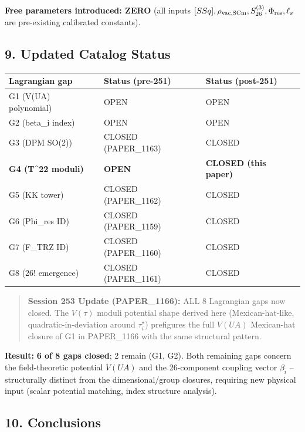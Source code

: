 \documentclass[
]{article}
\newcounter{none} %
\begin{document}
\textbf{Free parameters introduced: ZERO} (all inputs
\([SSq], \rho_{\rm vac,SCm},
S_{26}^{(3)}, \Phi_{\rm res}, \ell_s\) are pre-existing calibrated
constants).

\subsection{9. Updated Catalog Status}\label{updated-catalog-status}

{\def\LTcaptype{none} %
\begin{longtable}[]{@{}lll@{}}
\toprule\noalign{}
Lagrangian gap & Status (pre-251) & Status (post-251) \\
\midrule\noalign{}
\endhead
\bottomrule\noalign{}
\endlastfoot
G1 (V(UA) polynomial) & OPEN & OPEN \\
G2 (beta\_i index) & OPEN & OPEN \\
G3 (DPM SO(2)) & CLOSED (PAPER\_1163) & CLOSED \\
\textbf{G4 (T\^{}22 moduli)} & \textbf{OPEN} & \textbf{CLOSED (this
paper)} \\
G5 (KK tower) & CLOSED (PAPER\_1162) & CLOSED \\
G6 (Phi\_res ID) & CLOSED (PAPER\_1159) & CLOSED \\
G7 (F\_TRZ ID) & CLOSED (PAPER\_1160) & CLOSED \\
G8 (26! emergence) & CLOSED (PAPER\_1161) & CLOSED \\
\end{longtable}
}

\begin{quote}
\textbf{Session 253 Update (PAPER\_1166):} ALL 8 Lagrangian gaps now
closed. The \(V(\tau)\) moduli potential shape derived here
(Mexican-hat-like, quadratic-in-deviation around \(\tau_i^\star\))
prefigures the full \(V(UA)\) Mexican-hat closure of G1 in PAPER\_1166
with the same structural pattern.
\end{quote}

\textbf{Result:} \textbf{6 of 8 gaps closed}; 2 remain (G1, G2). Both
remaining gaps concern the field-theoretic potential \(V(UA)\) and the
26-component coupling vector \(\beta_i\) -- structurally distinct from
the dimensional/group closures, requiring new physical input (scalar
potential matching, index structure analysis).

\subsection{10. Conclusions}\label{conclusions}
\end{document}
